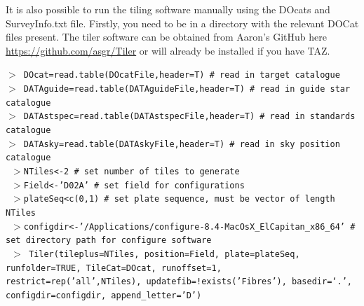 \documentclass[12pt]{article}
\begin{document}
It is also possible to run the tiling software manually using the DOcats and SurveyInfo.txt file. Firstly, you need to be in a directory with the relevant DOCat files present. The tiler software can be obtained from Aaron's GitHub here \url{https://github.com/asgr/Tiler} or will already be installed if you have TAZ.    

\texttt{$>$ DOcat=read.table(DOcatFile,header=T) \# read in target catalogue}\\
\texttt{$>$ DATAguide=read.table(DATAguideFile,header=T)  \# read in guide star catalogue}\\
\texttt{$>$ DATAstspec=read.table(DATAstspecFile,header=T) \# read in standards catalogue}\\
\texttt{$>$ DATAsky=read.table(DATAskyFile,header=T) \# read in sky position catalogue}\\

\texttt{ $>$NTiles<-2 \# set number of tiles to generate }\\
\texttt{ $>$Field<-'D02A'  \# set field for configurations}\\
\texttt{ $>$plateSeq<c(0,1) \# set plate sequence, must be vector of length NTiles}\\
\texttt{ $>$configdir<-'/Applications/configure-8.4-MacOsX\_ElCapitan\_x86\_64'  \# set directory path for configure software}\\

\texttt{ $>$ Tiler(tileplus=NTiles, position=Field, plate=plateSeq, runfolder=TRUE, TileCat=DOcat, runoffset=1, restrict=rep('all',NTiles), updatefib=!exists('Fibres'), basedir=`.', configdir=configdir, append\_letter='D') }\\
\end{document}
